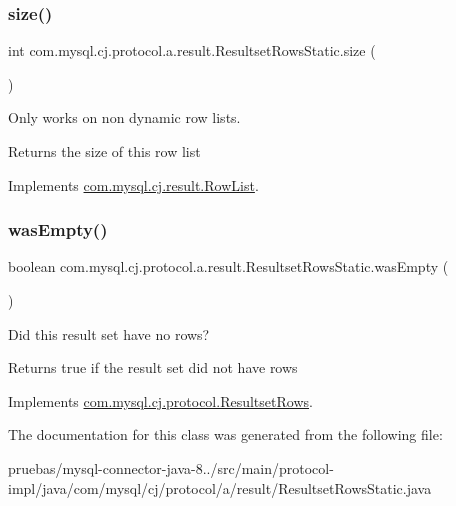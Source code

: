 \subsubsection{\texorpdfstring{size()}{size()}}
{\footnotesize\ttfamily int com.\+mysql.\+cj.\+protocol.\+a.\+result.\+Resultset\+Rows\+Static.\+size (\begin{DoxyParamCaption}{ }\end{DoxyParamCaption})}

Only works on non dynamic row lists.

\begin{DoxyReturn}{Returns}
the size of this row list 
\end{DoxyReturn}


Implements \mbox{\hyperlink{interfacecom_1_1mysql_1_1cj_1_1result_1_1_row_list_a2b6e2d9ed59e362e06b9fc8a110ccd89}{com.\+mysql.\+cj.\+result.\+Row\+List}}.

\mbox{\label{classcom_1_1mysql_1_1cj_1_1protocol_1_1a_1_1result_1_1_resultset_rows_static_ad18792e2f43667c3dc0b6e41a6de3026}} 
\subsubsection{\texorpdfstring{was\+Empty()}{wasEmpty()}}
{\footnotesize\ttfamily boolean com.\+mysql.\+cj.\+protocol.\+a.\+result.\+Resultset\+Rows\+Static.\+was\+Empty (\begin{DoxyParamCaption}{ }\end{DoxyParamCaption})}

Did this result set have no rows?

\begin{DoxyReturn}{Returns}
true if the result set did not have rows 
\end{DoxyReturn}


Implements \mbox{\hyperlink{interfacecom_1_1mysql_1_1cj_1_1protocol_1_1_resultset_rows_a46258b5b85f7536a54d62054403e6cf8}{com.\+mysql.\+cj.\+protocol.\+Resultset\+Rows}}.



The documentation for this class was generated from the following file\+:\begin{DoxyCompactItemize}
\item 
pruebas/mysql-\/connector-\/java-\/8../src/main/protocol-\/impl/java/com/mysql/cj/protocol/a/result/Resultset\+Rows\+Static.\+java\end{DoxyCompactItemize}
